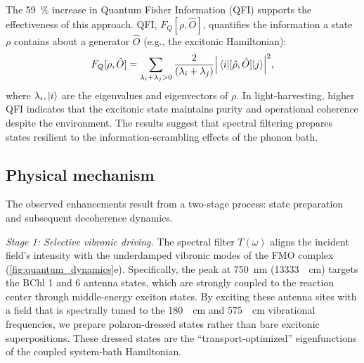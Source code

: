 \documentclass[journal=jpcl,manuscript=letter]{achemso}
\begin{document}
The \SI{59}{\percent} increase in Quantum Fisher Information (QFI) supports the effectiveness of this approach. QFI, $F_Q[\rho, \hat{O}]$, quantifies the information a state $\rho$ contains about a generator $\hat{O}$ (e.g., the excitonic Hamiltonian):
\begin{equation}
F_Q[\rho, \hat{O}] = \sum_{\lambda_i + \lambda_j > 0} \frac{2}{(\lambda_i + \lambda_j)} \abs{\mel{i}{[\hat{\rho}, \hat{O}]}{j}}^2,
\label{eq:QFI}
\end{equation}
where $\lambda_i, \ket{i}$ are the eigenvalues and eigenvectors of $\rho$. In light-harvesting, higher QFI indicates that the excitonic state maintains purity and operational coherence despite the environment.\cite{Pezze2009} The results suggest that spectral filtering prepares states resilient to the information-scrambling effects of the phonon bath.

\subsection*{Physical mechanism}

The observed enhancements result from a two-stage process: state preparation and subsequent decoherence dynamics. 

\textit{Stage 1: Selective vibronic driving.} The spectral filter $T(\omega)$ aligns the incident field's intensity with the underdamped vibronic modes of the FMO complex (\cref{fig:quantum_dynamics}e). Specifically, the peak at \SI{750}{\nano\meter} (\SI{13333}{\per\centi\meter}) targets the BChl 1 and 6 antenna states, which are strongly coupled to the reaction center through middle-energy exciton states. By exciting these antenna sites with a field that is spectrally tuned to the \SI{180}{\per\centi\meter} and \SI{575}{\per\centi\meter} vibrational frequencies, we prepare polaron-dressed states rather than bare excitonic superpositions. These dressed states are the ``transport-optimized'' eigenfunctions of the coupled system-bath Hamiltonian.\cite{Chin2013}
\end{document}
